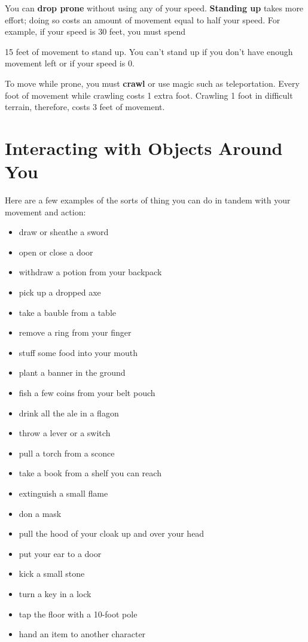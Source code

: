 You can \textbf{drop prone} without using any of your speed. \textbf{Standing up} takes more effort; doing so costs an amount of movement equal to half your speed. For example, if your speed is 30 feet, you must spend

15 feet of movement to stand up. You can't stand up if you don't have enough movement left or if your speed is 0.

To move while prone, you must \textbf{crawl} or use magic such as teleportation. Every foot of movement while crawling costs 1 extra foot. Crawling 1 foot in difficult terrain, therefore, costs 3 feet of movement.

\section{Interacting with Objects Around You}

Here are a few examples of the sorts of thing you can do in tandem with your movement and action:

\begin{itemize}
\item draw or sheathe a sword
\item open or close a door
\item withdraw a potion from your backpack
\item pick up a dropped axe
\item take a bauble from a table
\item remove a ring from your finger
\item stuff some food into your mouth
\item plant a banner in the ground
\item fish a few coins from your belt pouch
\item drink all the ale in a flagon
\item throw a lever or a switch
\item pull a torch from a sconce
\item take a book from a shelf you can reach
\item extinguish a small flame
\item don a mask
\item pull the hood of your cloak up and over your head
\item put your ear to a door
\item kick a small stone
\item turn a key in a lock
\item tap the floor with a 10-foot pole
\item hand an item to another character
\end{itemize}


